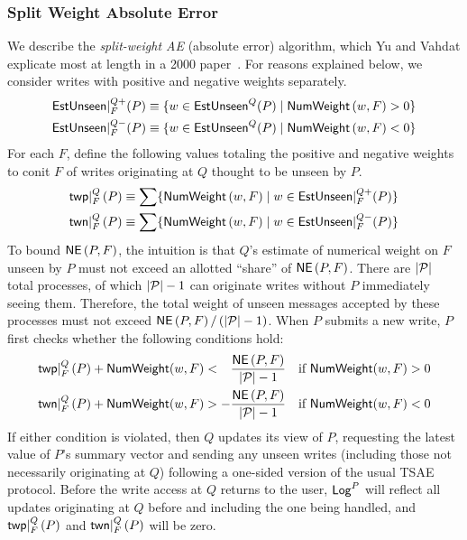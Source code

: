 \documentclass[]             %
{NASA}                       %
\theoremstyle{definition}
\begin{document}
\subsubsection{Split Weight Absolute Error}\label{sssec:conit-split-weight-ae}
We describe the \emph{split-weight AE} (absolute error) algorithm,
which Yu and Vahdat explicate most at length in a 2000
paper~\cite{2000tactalgorithms}. For reasons explained below, we
consider writes with positive and negative weights
separately.
\begin{gather}
  \EstUnseenPos{Q}{F}{P} \equiv \{ w \in \EstUnseen^{Q}{\left(P\right)} \mid \NumWeight\left(w, F\right) > 0 \} \\
  \EstUnseenNeg{Q}{F}{P} \equiv \{ w \in \EstUnseen^{Q}{\left(P\right)} \mid \NumWeight\left(w, F\right) < 0 \}
\end{gather}
For each $F$, define the following values totaling the positive and
negative weights to conit $F$ of writes originating at $Q$ thought to
be unseen by $P$.
\begin{gather}
  \twp{Q}{F}{P} \equiv \sum \{ \NumWeight\left(w, F\right) \mid w \in \EstUnseenPos{Q}{F}{P} \} \\
  \twn{Q}{F}{P} \equiv \sum \{ \NumWeight\left(w, F\right) \mid w \in \EstUnseenNeg{Q}{F}{P} \}
\end{gather}
To bound $\NE\left(P, F\right)$, the intuition is that $Q$'s estimate
of numerical weight on $F$ unseen by $P$ must not exceed an allotted
``share'' of $\NE\left(P, F\right)$. There are $|\AllProc|$ total
processes, of which $|\AllProc| - 1$ can originate writes
without $P$ immediately seeing them. Therefore, the total weight of
unseen messages accepted by these processes must not exceed
$\NE\left(P, F \right) / \left(|\AllProc| - 1\right)$.  When $P$
submits a new write, $P$ first checks whether the following
conditions hold:
\begin{align*}
  \twp{Q}{F}{P} + \NumWeight(w, F) &< \phantom{-}  \frac{\NE\left(P, F\right)}{|\AllProc| - 1} & \textrm{if $\NumWeight(w, F) > 0$} \\
  \twn{Q}{F}{P} + \NumWeight(w, F) &> - \frac{\NE\left(P, F\right)}{|\AllProc| - 1} & \textrm{if $\NumWeight(w, F) < 0$}
\end{align*}
If either condition is violated, then $Q$ updates its view of $P$,
requesting the latest value of $P$'s summary vector and sending any
unseen writes (including those not necessarily originating at $Q$)
following a one-sided version of the usual TSAE protocol. Before the write
access at $Q$ returns to the user, $\WL{P}$ will reflect all updates
originating at $Q$ before and including the one being handled, and
$\twp{Q}{F}{P}$ and $\twn{Q}{F}{P}$ will be zero.
\end{document}
